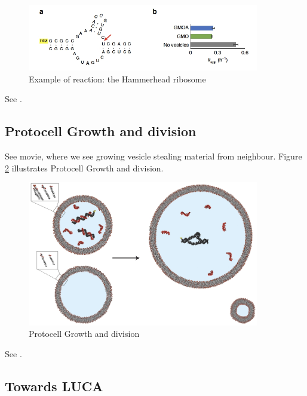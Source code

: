 \documentclass[]{article}
\begin{document}
\begin{figure}[H]
	\caption{Example of reaction: the Hammerhead ribosome}\label{fig:ProtocellsAndReactions3}
	\includegraphics[width=0.9\textwidth]{ProtocellsAndReactions3}
\end{figure}



See \cite{adamala2016programmable,monnard2015current}.

\subsection{Protocell Growth and division}
See movie, where we see growing vesicle stealing material from neighbour. 
Figure \ref{fig:ProtocellGrowthDivision} illustrates Protocell Growth and division.  

\begin{figure}[H]
	\caption{Protocell Growth and division}\label{fig:ProtocellGrowthDivision}
	\includegraphics[width=0.9\textwidth]{ProtocellGrowthDivision}
\end{figure}

See  \cite{zhu2012photochemically,chen2004emergence}.

\subsection{Towards LUCA}
\end{document}
